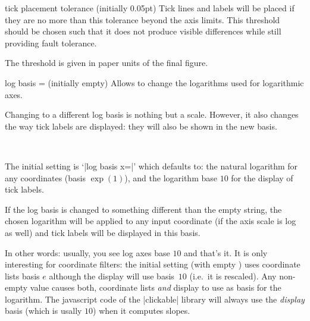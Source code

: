 \begin{pgfplotsxykeylist}{\x tick placement tolerance (initially 0.05pt)}
	Tick lines and labels will be placed if they are no more than this tolerance beyond the axis limits. This threshold should be chosen such that it does not produce visible differences while still providing fault tolerance.

	The threshold is given in paper units of the final figure.
\end{pgfplotsxykeylist}

\begin{pgfplotsxykey}{log basis \x= (initially empty)}
	Allows to change the logarithms used for logarithmic axes.

	Changing to a different log basis is nothing but a scale. However, it also changes the way tick labels are displayed: they will also be shown in the new basis.

\begin{codeexample}[]
~
\end{codeexample}
	
	The initial setting is `|log basis x=|' which defaults to: the natural logarithm for any coordinates (basis $\exp(1)$), and the logarithm base $10$ for the display of tick labels.

	If the log basis is changed to something different than the empty string, the chosen logarithm will be applied to any input coordinate (if the axis scale is log as well) and tick labels will be displayed in this basis. 

	In other words: usually, you see log axes base $10$ and that's it. It is only interesting for coordinate filters: 
	the initial setting (with empty ) uses coordinate lists basis $e$ although the display will use basis~$10$ (i.e.\ it is rescaled). Any non-empty value  causes both, coordinate lists \emph{and} display to use  as basis for the logarithm. The javascript code of the |clickable| library will always use the \emph{display} basis (which is usally $10$) when it computes slopes.


\end{pgfplotsxykey}
